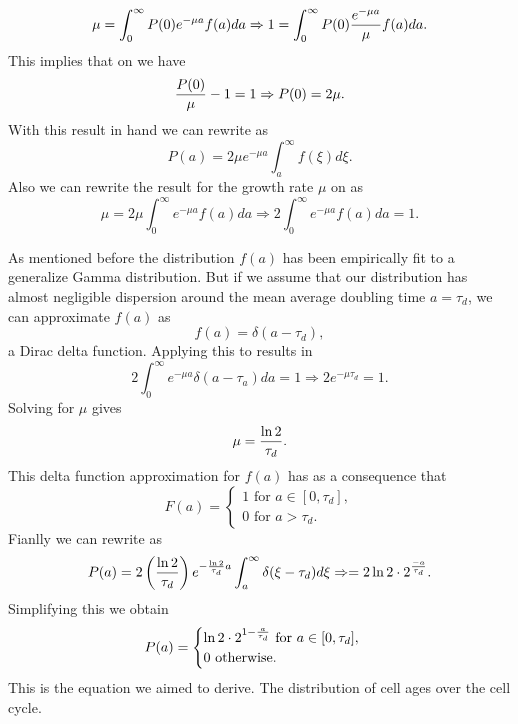 \begin{equation}
  \mu = \int_0^\infty P(0) e^{-\mu a} f(a)da \Rightarrow
  1 = \int_0^\infty P(0) {e^{-\mu a} \over \mu} f(a)da.
\end{equation}
This implies that on  we have
\begin{equation}
  {P(0) \over \mu} - 1 = 1 \Rightarrow P(0) = 2 \mu.
\end{equation}
With this result in hand we can rewrite  as
\begin{equation}
  P(a) = 2\mu e^{-\mu a} \int_a^\infty f(\xi) d\xi.
  \label{seq_Pa_Posubs}
\end{equation}
Also we can rewrite the result for the growth rate $\mu$ on
 as
\begin{equation}
  \mu = 2 \mu \int_0^\infty e^{-\mu a} f(a) da \Rightarrow
  2 \int_0^\infty e^{-\mu a} f(a) da = 1.
  \label{seq_fa_int}
\end{equation}

As mentioned before the distribution $f(a)$ has been empirically fit to a
generalize Gamma distribution. But if we assume that our distribution has almost
negligible dispersion around the mean average doubling time $a = \tau_d$, we can
approximate $f(a)$ as
\begin{equation}
  f(a) = \delta(a - \tau_d),
\end{equation}
a Dirac delta function. Applying this to  results in
\begin{equation}
  2 \int_0^\infty e^{-\mu a} \delta(a - \tau_a) da = 1
  \Rightarrow 2 e^{-\mu \tau_d} = 1.
\end{equation}
Solving for $\mu$ gives
\begin{equation}
  \mu = {\ln 2 \over \tau_d}.
\end{equation}
This delta function approximation for $f(a)$ has as a consequence that
\begin{equation}
  F(a) =
  \begin{cases}
    1 \text{ for } a \in [0, \tau_d],\\
    0 \text{ for } a > \tau_d.
  \end{cases}
\end{equation}
Fianlly we can rewrite  as
\begin{equation}
  P(a) = 2 \left( {\ln 2 \over \tau_d} \right)
  e^{- {\ln 2 \over \tau_d} a} \int_a^\infty \delta(\xi - \tau_d) d\xi
  \Rightarrow = 2 \ln 2 \cdot 2^{-a \over \tau_d}.
\end{equation}
Simplifying this we obtain
\begin{equation}
  P(a) =
  \begin{cases}
    \ln 2 \cdot 2^{1 - {a \over \tau_d}} \text{ for } a \in [0, \tau_d],\\
    0 \text{ otherwise}.
  \end{cases}
\end{equation}
This is the equation we aimed to derive. The distribution of cell ages over
the cell cycle.
